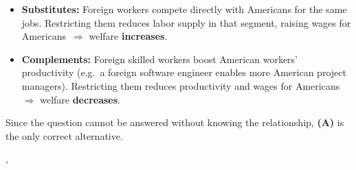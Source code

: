 {{    \begin{itemize}
      \item \textbf{Substitutes:} Foreign workers compete directly with
            Americans for the same jobs. Restricting them reduces labor supply
            in that segment, raising wages for Americans~$\Rightarrow$
            welfare \textbf{increases}.
      \item \textbf{Complements:} Foreign skilled workers boost American
            workers' productivity (e.g.\ a foreign software engineer enables
            more American project managers). Restricting them reduces
            productivity and wages for Americans~$\Rightarrow$ welfare
            \textbf{decreases}.
    \end{itemize}

    Since the question cannot be answered without knowing the relationship,
    \textbf{(A)} is the only correct alternative.
  },
}
